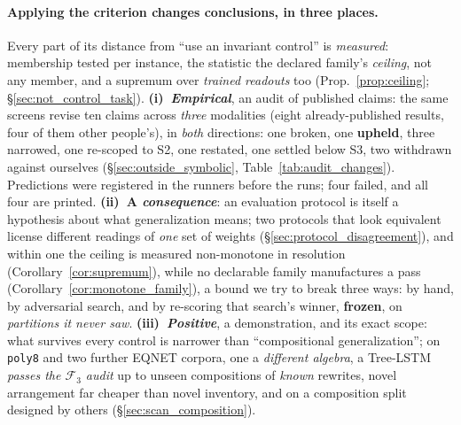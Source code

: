 \paragraph{Applying the criterion changes conclusions, in three places.} Every part of its distance from ``use an invariant control'' is \emph{measured}: membership tested per instance, the statistic the declared family's \emph{ceiling}, not any member, and a supremum over \emph{trained readouts} too (Prop.~\ref{prop:ceiling}; \S\ref{sec:not_control_task}). \textbf{(i)~\emph{Empirical}}, an audit of published claims: the same screens revise ten claims across \emph{three} modalities (eight already-published results, four of them other people's), in \emph{both} directions: one broken, one \textbf{upheld}, three narrowed, one re-scoped to S2, one restated, one settled below S3, two withdrawn against ourselves (\S\ref{sec:outside_symbolic}, Table~\ref{tab:audit_changes}). Predictions were registered in the runners before the runs; four failed, and all four are printed. \textbf{(ii)~A \emph{consequence}}: an evaluation protocol is itself a hypothesis about what generalization means; two protocols that look equivalent license different readings of \emph{one} set of weights (\S\ref{sec:protocol_disagreement}), and within one the ceiling is measured non-monotone in resolution (Corollary~\ref{cor:supremum}), while no declarable family manufactures a pass (Corollary~\ref{cor:monotone_family}), a bound we try to break three ways: by hand, by adversarial search, and by re-scoring that search's winner, \textbf{frozen}, on \emph{partitions it never saw}. \textbf{(iii)~\emph{Positive}}, a demonstration, and its exact scope: what survives every control is narrower than ``compositional generalization''; on \texttt{poly8} and two further EQNET corpora, one a \emph{different algebra}, a Tree-LSTM \emph{passes the $\mathcal{F}_3$ audit} up to unseen compositions of \emph{known} rewrites, novel arrangement far cheaper than novel inventory, and on a composition split designed by others (\S\ref{sec:scan_composition}).


